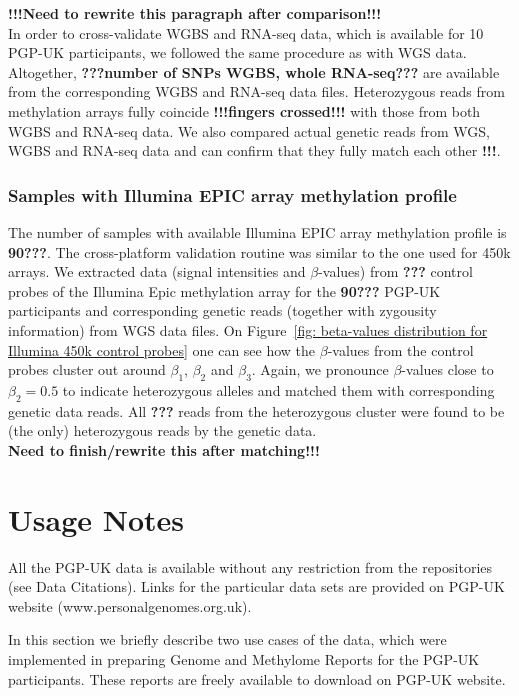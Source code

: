 \documentclass[english]{article}
\begin{document}
\textbf{!!!Need to rewrite this paragraph after comparison!!!}\\
In order to cross-validate WGBS and RNA-seq data, which is available for 10 PGP-UK participants, we followed the same procedure as with WGS data. Altogether, \textbf{???number of SNPs WGBS, whole RNA-seq???} are available from the corresponding WGBS and RNA-seq data files. Heterozygous reads from methylation arrays fully coincide \textbf{!!!fingers crossed!!!} with those from both WGBS and RNA-seq data. We also compared actual genetic reads from WGS, WGBS and RNA-seq data and can confirm that they fully match each other \textbf{!!!}. 

\subsubsection*{Samples with Illumina EPIC array methylation profile}
The number of samples with available Illumina EPIC array methylation profile is \textbf{90???}. The cross-platform validation routine was similar to the one used for 450k arrays. We extracted data (signal intensities and $\beta$-values) from \textbf{???} control probes of the Illumina Epic methylation array for the \textbf{90???} PGP-UK participants and corresponding genetic reads (together with zygousity information) from WGS data files. On Figure~\ref{fig: beta-values distribution for Illumina 450k control probes} one can see how the $\beta$-values from the control probes cluster out around $\beta_1$, $\beta_2$ and $\beta_3$. Again, we pronounce $\beta$-values close to $\beta_2=0.5$ to indicate heterozygous alleles and matched them with corresponding genetic data reads. All \textbf{???} reads from the heterozygous cluster were found to be (the only) heterozygous reads by the genetic data.
\\
\textbf{Need to finish/rewrite this after matching!!!}

\section*{Usage Notes}

All the PGP-UK data is available without any restriction from the repositories (see Data Citations). Links for the particular data sets are provided on PGP-UK website (www.personalgenomes.org.uk).

In this section we briefly describe two use cases of the data, which were implemented in preparing Genome and Methylome Reports for the PGP-UK participants. These reports are freely available to download on PGP-UK website.
\end{document}
